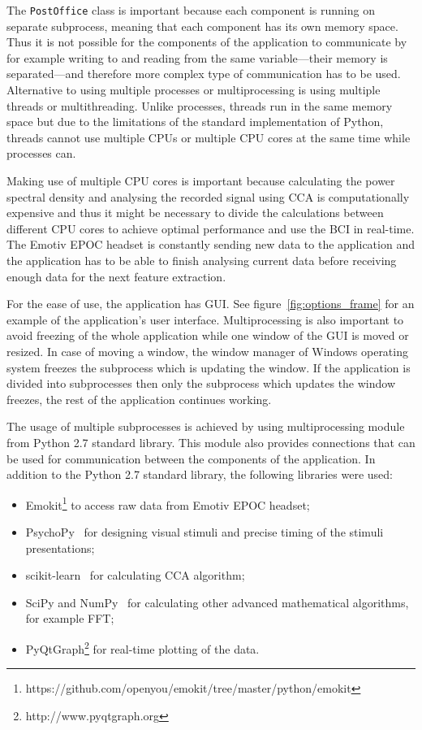 The \texttt{PostOffice} class is important because each component is running on separate subprocess, meaning that each component has its own memory space. Thus it is not possible for the components of the application to communicate by for example writing to and reading from the same variable---their memory is separated---and therefore more complex type of communication has to be used. Alternative to using multiple processes or multiprocessing is using multiple threads or multithreading. Unlike processes, threads run in the same memory space but due to the limitations of the standard implementation of Python, threads cannot use multiple \glspl{CPU} or multiple \gls{CPU} cores at the same time while processes can.

Making use of multiple \gls{CPU} cores is important because calculating the \gls{power spectral density} and analysing the recorded signal using \gls{CCA} is computationally expensive and thus it might be necessary to divide the calculations between different \gls{CPU} cores to achieve optimal performance and use the \gls{BCI} in real-time. The Emotiv EPOC headset is constantly sending new data to the application and the application has to be able to finish analysing current data before receiving enough data for the next \gls{feature extraction}.

For the ease of use, the application has \gls{GUI}. See figure~\ref{fig:options_frame} for an example of the application's user interface. Multiprocessing is also important to avoid freezing of the whole application while one window of the \gls{GUI} is moved or resized. In case of moving a window, the window manager of Windows operating system freezes the subprocess which is updating the window. If the application is divided into subprocesses then only the subprocess which updates the window freezes, the rest of the application continues working.

The usage of multiple subprocesses is achieved by using multiprocessing module from Python 2.7 standard library. This module also provides connections that can be used for communication between the components of the application. In addition to the Python 2.7 standard library, the following libraries were used:
\begin{itemize}
	\item Emokit\footnote{https://github.com/openyou/emokit/tree/master/python/emokit} to access raw data from Emotiv EPOC headset;
	\item PsychoPy~\cite{psychopy} for designing visual stimuli and precise timing of the stimuli presentations;
	\item scikit-learn~\cite{scikit-learn} for calculating \gls{CCA} algorithm;
	\item SciPy and NumPy~\cite{scipy} for calculating other advanced mathematical algorithms, for example \gls{FFT};
	\item PyQtGraph\footnote{http://www.pyqtgraph.org} for real-time plotting of the data.
\end{itemize}

